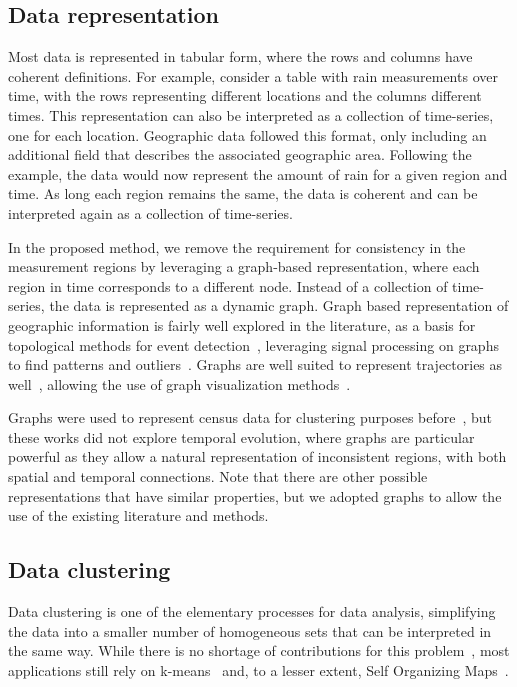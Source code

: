 \subsection{Data representation}
Most data is represented in tabular form, where the rows and columns have
coherent definitions. For example, consider a table with rain measurements over
time, with the rows representing different locations and the columns different
times. This representation can also be interpreted as a collection of
time-series, one for each location. Geographic data followed this format, only
including an additional field that describes the associated geographic area.
Following the example, the data would now represent the amount of rain for a
given region and time. As long each region remains the same, the data is
coherent and can be interpreted again as a collection of time-series.

In the proposed method, we remove the requirement for consistency in the
measurement regions by leveraging a graph-based representation, where each
region in time corresponds to a different node. Instead of a collection of
time-series, the data is represented as a dynamic graph. Graph based
representation of geographic information is fairly well explored in the
literature, as a basis for topological methods for event
detection~\cite{Doraiswamy2014}, leveraging signal processing on
graphs~\cite{shuman2013emerging,sandryhaila2013discrete} to find patterns and
outliers~\cite{Valdivia2015,Dias2015,Alce2018}. Graphs are well suited to
represent trajectories as
well~\cite{VonLandesberger2016,Huang2016,chen2015survey}, allowing the use of
graph visualization methods~\cite{Vehlow2015,Beck2014}. 

Graphs were used to represent census data for clustering purposes
before~\cite{Dias2015,Setiadi2017}, but these works did not explore temporal
evolution, where graphs are particular powerful as they allow a natural
representation of inconsistent regions, with both spatial and temporal
connections. Note that there are other possible representations that have
similar properties, but we adopted graphs to allow the use of the existing
literature and methods.


\subsection{Data clustering}
Data clustering is one of the elementary processes for data analysis,
simplifying the data into a smaller number of homogeneous sets that can be
interpreted in the same way. While there is no shortage of contributions for
this problem~\cite{Fahad2014}, most applications still rely on
k-means~\cite{jain2010data,Delmelle2016} and, to a lesser extent, Self
Organizing Maps~\cite{Delmelle2017,Ling2016}.

